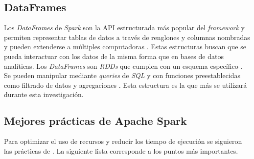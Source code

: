 \subsection{DataFrames}

Los \textit{DataFrames} de \textit{Spark} son la API estructurada más popular del \textit{framework} y permiten representar tablas de datos a través de renglones y columnas nombradas y pueden extenderse a múltiples computadoras \cite{sparkguide}. Estas estructuras buscan que se pueda interactuar con los datos de la misma forma que en bases de datos analíticas. Los \textit{DataFrames} son \textit{RDDs} que cumplen con un esquema específico \cite{sparkberkeley}. Se pueden manipular mediante \textit{queries} de \textit{SQL} y con funciones preestablecidas como filtrado de datos y agregaciones \cite{sparkberkeley}. Esta estructura es la que más se utilizará durante esta investigación.

\subsection{Mejores prácticas de Apache Spark}

Para optimizar el uso de recursos y reducir los tiempo de ejecución se siguieron las prácticas de \cite{sparkibm}. La siguiente lista corresponde a los puntos más importantes.

